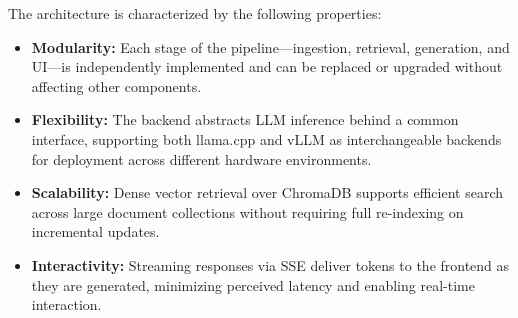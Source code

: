 The architecture is characterized by the following properties:

\begin{itemize}
    \item \textbf{Modularity:} Each stage of the pipeline—ingestion, retrieval, generation, and UI—is independently implemented and can be replaced or upgraded without affecting other components.

    \item \textbf{Flexibility:} The backend abstracts LLM inference behind a common interface, supporting both llama.cpp \parencite{llamacpp} and vLLM \parencite{vllm2023} as interchangeable backends for deployment across different hardware environments.

    \item \textbf{Scalability:} Dense vector retrieval over ChromaDB \parencite{chromadb} supports efficient search across large document collections without requiring full re-indexing on incremental updates.

    \item \textbf{Interactivity:} Streaming responses via SSE deliver tokens to the frontend as they are generated, minimizing perceived latency and enabling real-time interaction.
\end{itemize}
